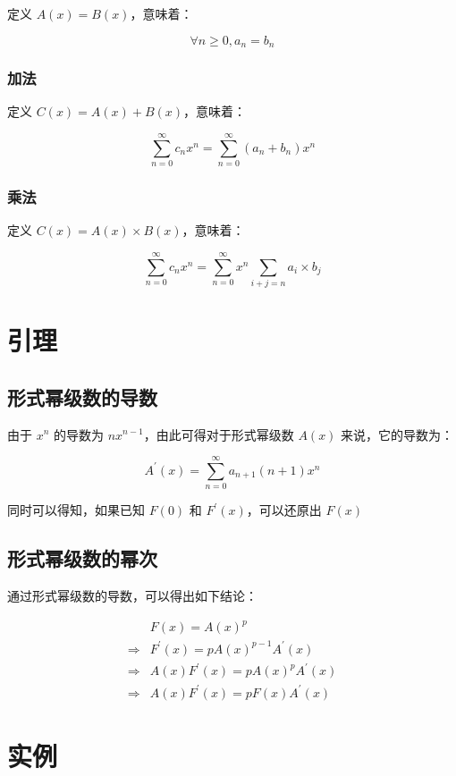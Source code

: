 \documentclass[UTF8]{article}
\begin{document}
定义 $A(x)=B(x)$，意味着：

$$
\forall n \ge 0,a_n=b_n
$$

\subsubsection{加法}

定义 $C(x)=A(x)+B(x)$，意味着：

$$
\sum_{n=0}^{\infty}c_nx^n=\sum_{n=0}^{\infty}(a_n+b_n)x^n
$$

\subsubsection{乘法}

定义 $C(x)=A(x) \times B(x)$，意味着：

$$
\sum_{n=0}^{\infty}c_nx^n=\sum_{n=0}^{\infty}x^n \sum_{i+j=n} a_i \times b_j
$$

\section{引理}

\subsection{形式幂级数的导数}

由于 $x^n$ 的导数为 $nx^{n-1}$，由此可得对于形式幂级数 $A(x)$ 来说，它的导数为：

$$
A ^\prime (x)=\sum_{n=0}^{\infty} a_{n+1}(n+1)x^n
$$

同时可以得知，如果已知 $F(0)$ 和 $F ^\prime (x)$，可以还原出 $F(x)$

\subsection{形式幂级数的幂次}

通过形式幂级数的导数，可以得出如下结论：

$$
\begin{aligned}
    & F(x)=A(x)^{p} \\
    \Rightarrow & F ^\prime (x)=pA(x)^{p-1}A ^\prime (x) \\
    \Rightarrow & A(x)F ^\prime (x)=pA(x)^pA ^\prime (x) \\
    \Rightarrow & A(x)F ^\prime (x)=pF(x)A ^\prime (x)
\end{aligned}
$$

\section{实例}
\end{document}

